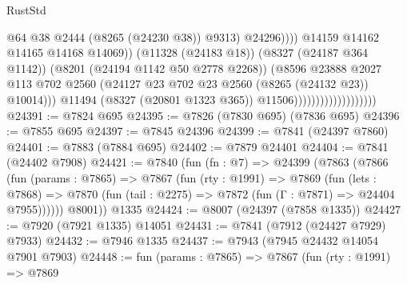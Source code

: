 \begin{lexlean}{RustStd}
\begin{coremodule}
{\begin{coremodule}
{{{{{{{{{{{{{{{{{{{{{{{{{{{{{{{{{{{{{{{{{{{{{{{{{{{{{{                                                          @64
                                                          @38
                                                          @2444
                                                          (@8265 (@24230 @38))
                                                          @9313)
                                                        @24296))))
                                                @14159
                                                @14162
                                                @14165
                                                @14168
                                                @14069))
                                            (@11328 (@24183 @18))
                                            (@8327 (@24187 @364 @1142))
                                            (@8201 (@24194 @1142 @50 @2778 @2268))
                                            (@8596
                                              @23888
                                              @2027
                                              @113
                                              @702
                                              @2560
                                              (@24127
                                                @23
                                                @702
                                                @23
                                                @2560
                                                (@8265 (@24132 @23))
                                                @10014)))
                                          @11494
                                          (@8327 (@20801 @1323 @365))
                                          @11506)))))))))))))))))))
@24391 := @7824 @695
@24395 := @7826 (@7830 @695) (@7836 @695)
@24396 := @7855 @695
@24397 := @7845 @24396
@24399 := @7841 (@24397 @7860)
@24401 := @7883 (@7884 @695)
@24402 := @7879 @24401
@24404 := @7841 (@24402 @7908)
@24421 := @7840
    (fun (fn : @7) =>
    @24399
      (@7863
        (@7866
          (fun (params : @7865) =>
          @7867
            (fun (rty : @1991) =>
            @7869
              (fun (lets : @7868) =>
              @7870 (fun (tail : @2275) => @7872 (fun (Γ : @7871) => @24404 @7955))))))
        @8001))
    @1335
@24424 := @8007 (@24397 (@7858 @1335))
@24427 := @7920 (@7921 @1335) @14051
@24431 := @7841 (@7912 (@24427 @7929) @7933)
@24432 := @7946 @1335
@24437 := @7943 (@7945 @24432 @14054 @7901 @7903)
@24448 := fun (params : @7865) =>
  @7867
    (fun (rty : @1991) =>
    @7869
}}}}}}}}}}}}}}}}}}}}}}}}}}}}}}}}}}}}}}}}}}}}}}}}}}}}}}
\end{coremodule}}
\end{coremodule}
\end{lexlean}
